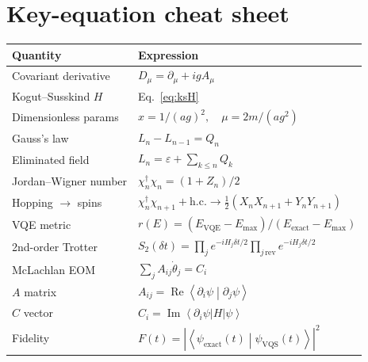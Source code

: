 \documentclass[11pt,a4paper]{article}
\newcommand{\braket}[2]{\left\langle#1\middle|#2\right\rangle}
\newcommand{\ev}[1]{\left\langle#1\right\rangle}
\newcommand{\Real}{\operatorname{Re}}
\newcommand{\Imag}{\operatorname{Im}}
\begin{document}
\appendix
\newpage
\section{Key-equation cheat sheet}
\begin{center}
\renewcommand{\arraystretch}{1.5}
\begin{tabular}{>{\raggedright\arraybackslash}p{} l}
\toprule
\textbf{Quantity} & \textbf{Expression} \\
\midrule
Covariant derivative & $D_\mu=\partial_\mu+igA_\mu$ \\
Kogut--Susskind $H$ & Eq.~\eqref{eq:ksH} \\
Dimensionless params & $x=1/(ag)^2,\quad \mu=2m/(ag^2)$ \\
Gauss's law & $L_n-L_{n-1}=Q_n$ \\
Eliminated field & $L_n=\varepsilon+\sum_{k\le n}Q_k$ \\
Jordan--Wigner number & $\chi^\dagger_n\chi_n=(1+Z_n)/2$ \\
Hopping $\to$ spins & $\chi^\dagger_n\chi_{n+1}+\text{h.c.}\to\tfrac12(X_nX_{n+1}+Y_nY_{n+1})$ \\
VQE metric & $r(E)=(E_{\text{VQE}}-E_{\max})/(E_{\text{exact}}-E_{\max})$ \\
2nd-order Trotter & $S_2(\delta t)=\prod_j e^{-iH_j\delta t/2}\prod_{j\,\text{rev}}e^{-iH_j\delta t/2}$ \\
McLachlan EOM & $\sum_j A_{ij}\dot\theta_j=C_i$ \\
$A$ matrix & $A_{ij}=\Real\braket{\partial_i\psi}{\partial_j\psi}$ \\
$C$ vector & $C_i=\Imag\ev{\partial_i\psi|H|\psi}$ \\
Fidelity & $F(t)=|\braket{\psi_{\text{exact}}(t)}{\psi_{\text{VQS}}(t)}|^2$ \\
\bottomrule
\end{tabular}
\end{center}
\end{document}
